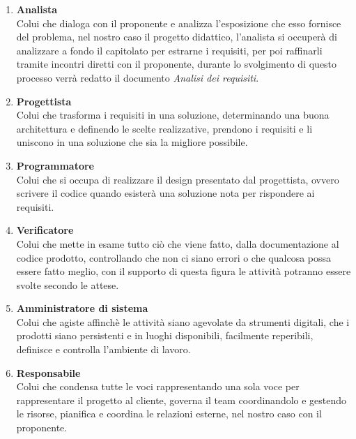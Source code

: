            \begin{enumerate}
                \item \textbf{Analista}\\
                Colui che dialoga con il proponente e analizza l'esposizione che esso fornisce del 
                problema, nel nostro caso il progetto didattico, l'analista si occuperà di 
                analizzare a fondo il capitolato per estrarne i requisiti, per poi raffinarli 
                tramite incontri diretti con il proponente, durante lo svolgimento di questo 
                processo verrà redatto il documento \textit{Analisi dei requisiti}.
                \item \textbf{Progettista}\\
                Colui che trasforma i requisiti in una soluzione, determinando una buona 
                architettura e definendo le scelte realizzative, prendono i requisiti 
                e li uniscono in una soluzione che sia la migliore possibile.
                \item \textbf{Programmatore}\\
                Colui che si occupa di realizzare il design presentato dal progettista, 
                ovvero scrivere il codice quando esisterà una soluzione nota per rispondere 
                ai requisiti.
                \item \textbf{Verificatore}\\
                Colui che mette in esame tutto ciò che viene fatto, dalla documentazione 
                al codice prodotto, controllando che non 
                ci siano errori o che qualcosa possa essere fatto meglio, con il supporto 
                di questa figura le attività potranno essere svolte secondo le attese.
                \item \textbf{Amministratore di sistema}\\
                Colui che agiste affinchè le attività siano agevolate da strumenti digitali, 
                che i prodotti siano persistenti e in luoghi disponibili, facilmente reperibili, definisce e 
                controlla l'ambiente di lavoro.
                \item \textbf{Responsabile}\\
                Colui che condensa tutte le voci rappresentando una sola voce per rappresentare il progetto 
                al cliente, governa il team coordinandolo e gestendo le risorse, pianifica e coordina 
                le relazioni esterne, nel nostro caso con il proponente.\\
            \end{enumerate}

